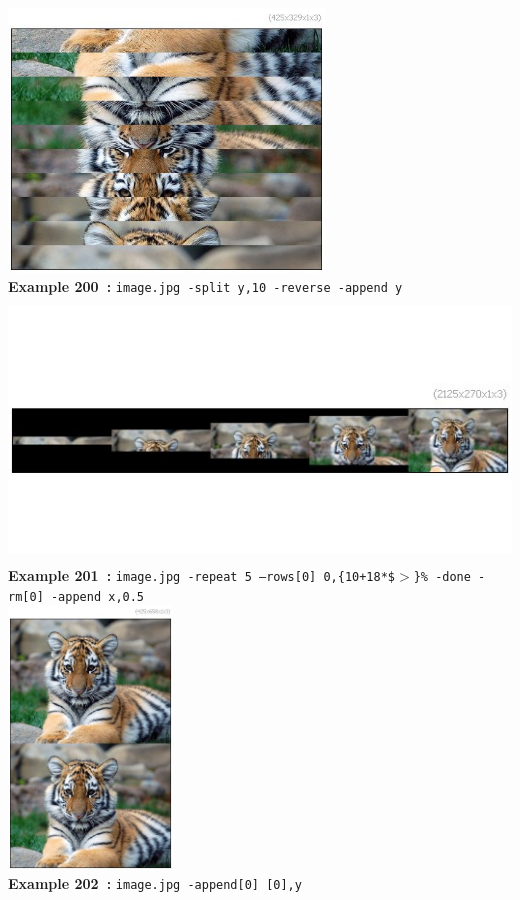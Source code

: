 \documentclass[a4paper,11pt,twoside]{book}
\begin{document}
\begin{center}\includegraphics[keepaspectratio=true,height=7cm,width=\textwidth]{img/gmic_def200.jpg}\\
{\footnotesize \textbf{Example 200~:} \texttt{image.jpg -split y,10 -reverse -append y}}
\\\includegraphics[keepaspectratio=true,height=7cm,width=\textwidth]{img/gmic_def201.jpg}\\
{\footnotesize \textbf{Example 201~:} \texttt{image.jpg -repeat 5 --rows[0] 0,\{10+18*\$$>$\}\% -done -rm[0] -append x,0.5}}
\\\includegraphics[keepaspectratio=true,height=7cm,width=\textwidth]{img/gmic_def202.jpg}\\
{\footnotesize \textbf{Example 202~:} \texttt{image.jpg -append[0] [0],y}}
\end{center}
\end{document}
